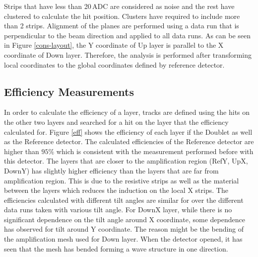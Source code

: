 \documentclass[a4paper,11pt]{article}
\newcommand{\myunit}[1]{$\, \mathrm{#1}$}
\begin{document}
Strips that have less than 20\myunit{ADC} are considered as noise and the rest have clustered to calculate the hit position. Clusters have required to include more than 2 strips. Alignment of the planes are performed using a data run that is perpendicular to the beam direction and applied to all data runs. As can be seen in Figure \ref{cons-layout}, the Y coordinate of Up layer is parallel to the X coordinate of Down layer. Therefore, the analysis is performed after transforming local coordinates to the global coordinates defined by reference detector.

\subsection{Efficiency Measurements}

In order to calculate the efficiency of a layer, tracks are defined using the hits on the other two layers and searched for a hit on the layer that the efficiency calculated for. Figure \ref{eff} shows the efficiency of each layer if the Doublet as well as the Reference detector. The calculated efficiencies of the Reference detector are higher than $95\%$ which is consistent with the measurement performed before \cite{Lin2014281} with this detector. The layers that are closer to the amplification region (RefY, UpX, DownY) has slightly higher efficiency than the layers that are far from amplification region. This is due to the resistive strips as well as the material between the layers which reduces the induction on the local X strips. The efficiencies calculated with different tilt angles are similar for over the different data runs taken with various tilt angle. For DownX layer, while there is no significant dependence on the tilt angle around X coordinate, some dependence has observed for tilt around Y coordinate. The reason might be the bending of the amplification mesh used for Down layer. When the detector opened, it has seen that the mesh has bended forming a wave structure in one direction.

\end{document}
